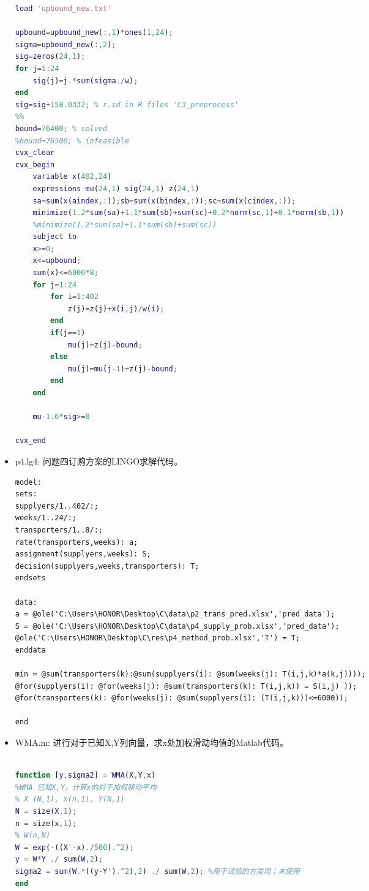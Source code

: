 \documentclass{my_paper}
\begin{document}
\begin{itemize}
\begin{lstlisting}[language={Matlab}]
load 'upbound_new.txt'

upbound=upbound_new(:,1)*ones(1,24);
sigma=upbound_new(:,2);
sig=zeros(24,1);
for j=1:24
    sig(j)=j.*sum(sigma./w);
end
sig=sig+158.0332; % r.sd in R files 'C3_preprocess'
%%
bound=76400; % solved
%bound=76500; % infeasible
cvx_clear
cvx_begin
    variable x(402,24) 
    expressions mu(24,1) sig(24,1) z(24,1)
    sa=sum(x(aindex,:));sb=sum(x(bindex,:));sc=sum(x(cindex,:));
    minimize(1.2*sum(sa)+1.1*sum(sb)+sum(sc)+0.2*norm(sc,1)+0.1*norm(sb,1))
    %minimize(1.2*sum(sa)+1.1*sum(sb)+sum(sc))
    subject to
    x>=0;
    x<=upbound;
    sum(x)<=6000*8;
    for j=1:24
        for i=1:402
            z(j)=z(j)+x(i,j)/w(i);
        end
        if(j==1)
            mu(j)=z(j)-bound;
        else
            mu(j)=mu(j-1)+z(j)-bound;
        end
    end
    
    mu-1.6*sig>=0
    
cvx_end

\end{lstlisting}
\item p4.lg4: 问题四订购方案的LINGO求解代码。

\begin{lstlisting}
model:
sets:
supplyers/1..402/:;
weeks/1..24/:;
transporters/1..8/:;
rate(transporters,weeks): a;
assignment(supplyers,weeks): S;
decision(supplyers,weeks,transporters): T; 
endsets

data:
a = @ole('C:\Users\HONOR\Desktop\C\data\p2_trans_pred.xlsx','pred_data');
S = @ole('C:\Users\HONOR\Desktop\C\data\p4_supply_prob.xlsx','pred_data');
@ole('C:\Users\HONOR\Desktop\C\res\p4_method_prob.xlsx','T') = T;
enddata

min = @sum(transporters(k):@sum(supplyers(i): @sum(weeks(j): T(i,j,k)*a(k,j)))); 
@for(supplyers(i): @for(weeks(j): @sum(transporters(k): T(i,j,k)) = S(i,j) ));
@for(transporters(k): @for(weeks(j): @sum(supplyers(i): (T(i,j,k)))<=6000)); 

end

\end{lstlisting}


\item WMA.m: 进行对于已知X,Y列向量，求x处加权滑动均值的Matlab代码。

\begin{lstlisting}[language={Matlab}]

function [y,sigma2] = WMA(X,Y,x)
%WMA 已知X,Y，计算x的对于加权移动平均
% X (N,1), x(n,1), Y(N,1)
N = size(X,1);
n = size(x,1);
% W(n,N)
W = exp(-((X'-x)./500).^2); 
y = W*Y ./ sum(W,2);
sigma2 = sum(W.*((y-Y').^2),2) ./ sum(W,2); %用于试验的方差项；未使用
end


\end{lstlisting}
\end{itemize}
\end{document}
